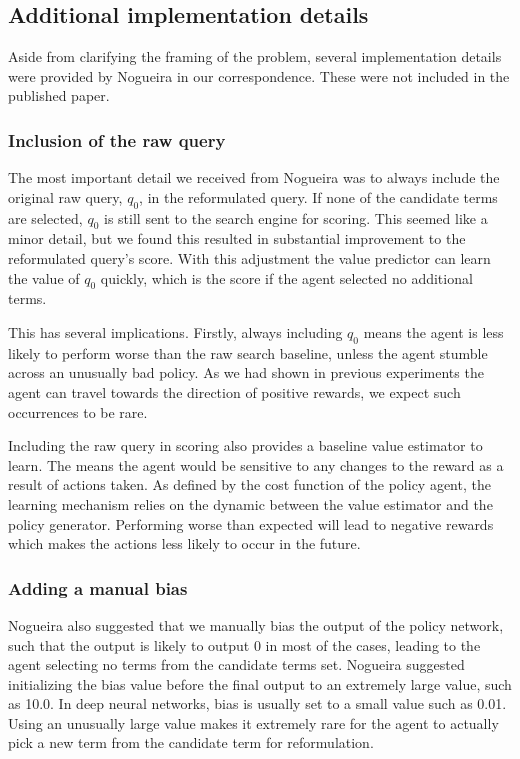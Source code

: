 \subsection{Additional implementation details}

Aside from clarifying the framing of the problem, several implementation details were provided by Nogueira in our correspondence. These were not included in the published paper. 

\subsubsection{Inclusion of the raw query}

The most important detail we received from Nogueira was to always include the original raw query, $q_0$, in the reformulated query.  If none of the candidate terms are selected, $q_0$ is still sent to the search engine for scoring.  This seemed like a minor detail, but we found this resulted in substantial improvement to the reformulated query's score. With this adjustment the value predictor can learn the value of  $q_0$ quickly, which is the score if the agent selected no additional terms. 

This has several implications. Firstly, always including $q_0$ means the agent is less likely to perform worse than the raw search baseline, unless the agent stumble across an unusually bad policy. As we had shown in previous experiments the agent can travel towards the direction of positive rewards, we expect such occurrences to be rare. 

Including the raw query in scoring also provides a baseline value estimator to learn. The means the agent would be sensitive to any changes to the reward as a result of actions taken. As defined by the cost function of the policy agent, the learning mechanism relies on the dynamic between the value estimator and the policy generator. Performing worse than expected will lead to negative rewards which makes the actions less likely to occur in the future.

\subsubsection{Adding a manual bias}

Nogueira also suggested that we manually bias the output of the policy network, such that the output is likely to output 0 in most of the cases, leading to the agent selecting no terms from the candidate terms set. Nogueira suggested initializing the bias value before the final output to an extremely large value, such as 10.0. In deep neural networks, bias is usually set to a small value such as 0.01. Using an unusually large value makes it extremely rare for the agent to actually pick a new term from the candidate term for reformulation. 
 
